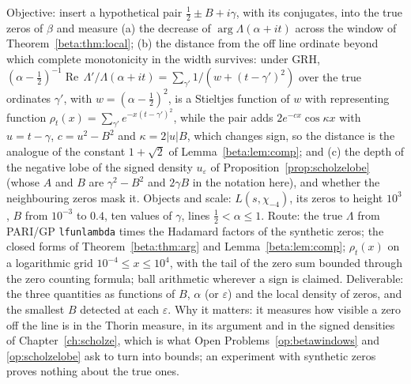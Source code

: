 \begin{compproblem}\label{cp:betasynthetic}
Objective: insert a hypothetical pair $\tfrac12\pm B+i\gamma$, with its conjugates, into the true zeros of $\beta$ and measure (a) the decrease of $\arg\Lambda(\alpha+it)$ across the window of Theorem~\ref{beta:thm:local}; (b) the distance from the off line ordinate beyond which complete monotonicity in the width survives: under GRH, $(\alpha-\tfrac12)^{-1}\operatorname{Re}\,\Lambda'/\Lambda(\alpha+it)=\sum_{\gamma'}1/(w+(t-\gamma')^2)$ over the true ordinates $\gamma'$, with $w=(\alpha-\tfrac12)^2$, is a Stieltjes function of $w$ with representing function $\rho_t(x)=\sum_{\gamma'}e^{-x(t-\gamma')^2}$, while the pair adds $2e^{-cx}\cos\kappa x$ with $u=t-\gamma$, $c=u^2-B^2$ and $\kappa=2|u|B$, which changes sign, so the distance is the analogue of the constant $1+\sqrt2$ of Lemma~\ref{beta:lem:comp}; and (c) the depth of the negative lobe of the signed density $u_\varepsilon$ of Proposition~\ref{prop:scholzelobe} (whose $A$ and $B$ are $\gamma^2-B^2$ and $2\gamma B$ in the notation here), and whether the neighbouring zeros mask it. Objects and scale: $L(s,\chi_{-4})$, its zeros to height $10^3$, $B$ from $10^{-3}$ to $0.4$, ten values of $\gamma$, lines $\tfrac12<\alpha\le1$. Route: the true $\Lambda$ from PARI/GP \texttt{lfunlambda} times the Hadamard factors of the synthetic zeros; the closed forms of Theorem~\ref{beta:thm:arg} and Lemma~\ref{beta:lem:comp}; $\rho_t(x)$ on a logarithmic grid $10^{-4}\le x\le10^4$, with the tail of the zero sum bounded through the zero counting formula; ball arithmetic wherever a sign is claimed. Deliverable: the three quantities as functions of $B$, $\alpha$ (or $\varepsilon$) and the local density of zeros, and the smallest $B$ detected at each $\varepsilon$. Why it matters: it measures how visible a zero off the line is in the Thorin measure, in its argument and in the signed densities of Chapter~\ref{ch:scholze}, which is what Open Problems~\ref{op:betawindows} and \ref{op:scholzelobe} ask to turn into bounds; an experiment with synthetic zeros proves nothing about the true ones.
\end{compproblem}
